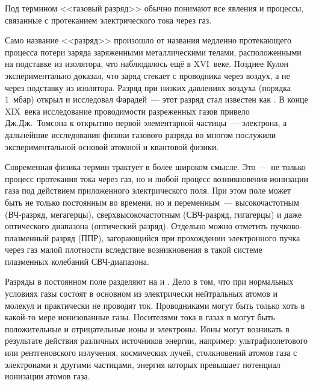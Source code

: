 \begin{labsupplement}
\label{sec:discharge}

Под термином <<газовый разряд>> обычно понимают все явления и процессы,
связанные с протеканием электрического тока через газ.

Само название <<разряд>> произошло от названия медленно протекающего
процесса потери заряда заряженными металлическими телами,
расположенными на подставке из изолятора, что наблюдалось ещё в
XVI~веке. Позднее Кулон экспериментально доказал, что заряд стекает
с проводника через воздух, а не через подставку из изолятора.
Разряд при низких давлениях воздуха (порядка 1~мбар) открыл и исследовал
Фарадей~--- этот разряд стал известен как . В конце XIX~века
исследование проводимости разреженных газов привело Дж.Дж.~Томсона к
открытию первой элементарной частицы~--- электрона, а дальнейшие исследования
физики газового разряда во многом послужили экспериментальной основой
атомной и квантовой физики.


Современная физика термин  трактует в более широком
смысле. Это~--- не только процесс протекания тока через газ, но и любой процесс
возникновения ионизации газа под действием приложенного электрического поля.
При этом поле может быть не только постоянным во времени,
но и переменным~--- высокочастотным (ВЧ-разряд, мегагерцы),
сверхвысокочастотным (СВЧ-разряд, гигагерцы) и даже оптического диапазона
(оптический разряд). Отдельно можно отметить пучково-плазменный разряд (ППР),
загорающийся при прохождении электронного пучка через газ малой плотности
вследствие возникновения в такой системе плазменных колебаний СВЧ-диапазона.

Разряды в постоянном поле разделяют на  и
. Дело в том, что при нормальных
условиях газы состоят в основном из электрически нейтральных атомов и
молекул и практически не проводят ток.
Проводниками могут быть только хоть в какой-то мере ионизованные газы.
Носителями тока в газах в могут быть положительные и отрицательные ионы и электроны.
Ионы могут возникать в результате действия различных
источников энергии, например: ультрафиолетового или рентгеновского излучения,
космических лучей, столкновений атомов газа с электронами и другими частицами, энергия
которых превышает потенциал ионизации атомов газа.


\end{labsupplement}
